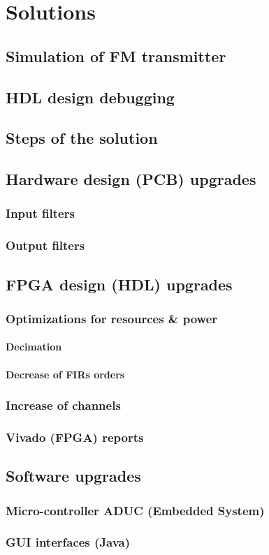 \chapter{Solutions}
\section{Simulation of FM transmitter}
\section{HDL design debugging}
\section{Steps of the solution}
\section{Hardware design (PCB) upgrades}
\subsection{Input filters}
\subsection{Output filters}


\section{FPGA design (HDL) upgrades}

\subsection{Optimizations for resources \& power}

\subsubsection{Decimation}
\subsubsection{Decrease of FIRs orders}

\subsection{Increase of channels}

\subsection{Vivado (FPGA) reports}




\section{Software upgrades}
\subsection{Micro-controller ADUC (Embedded System)}
\subsection{GUI interfaces (Java)}
